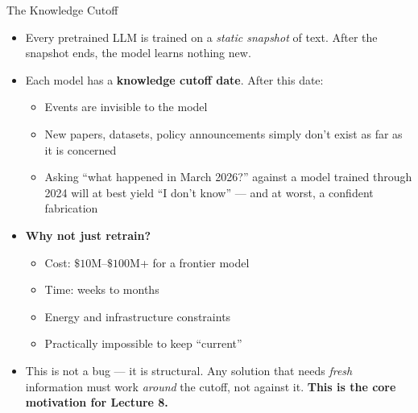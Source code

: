 \documentclass[10pt,english,aspectratio=169]{beamer}
\begin{document}
\begin{frame}{The Knowledge Cutoff}
\begin{itemize}
\item Every pretrained LLM is trained on a \emph{static snapshot} of text. After the snapshot ends, the model learns nothing new.

\medskip
\item Each model has a \textbf{knowledge cutoff date}. After this date:
\begin{itemize}
    \item Events are invisible to the model
    \item New papers, datasets, policy announcements simply don't exist as far as it is concerned
    \item Asking ``what happened in March 2026?'' against a model trained through 2024 will at best yield ``I don't know'' --- and at worst, a confident fabrication
\end{itemize}

\medskip
\item \textbf{Why not just retrain?}
\begin{itemize}
    \item Cost: $\$10$M--$\$100$M+ for a frontier model
    \item Time: weeks to months
    \item Energy and infrastructure constraints
    \item Practically impossible to keep ``current''
\end{itemize}

\medskip
\item This is not a bug --- it is structural. Any solution that needs \emph{fresh} information must work \emph{around} the cutoff, not against it. \textbf{This is the core motivation for Lecture 8.}
\end{itemize}
\end{frame}
\end{document}
